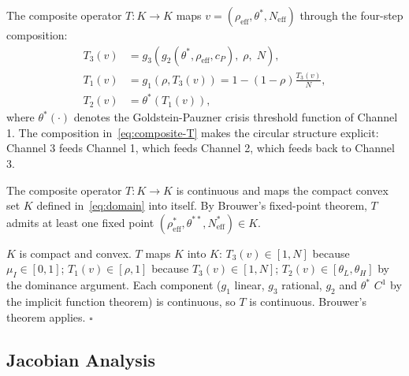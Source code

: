 The composite operator $T: K \to K$ maps $v = (\rho_{\text{eff}}, \theta^*, N_{\text{eff}})$ through the four-step composition:
\begin{equation}\label{eq:composite-T}
\begin{aligned}
  T_3(v) &= g_3\!\left(g_2(\theta^*, \rho_{\text{eff}}, c_P),\; \rho,\; N\right), \\
  T_1(v) &= g_1(\rho, T_3(v)) = 1 - (1-\rho)\frac{T_3(v)}{N}, \\
  T_2(v) &= \theta^*(T_1(v)),
\end{aligned}
\end{equation}
where $\theta^*(\cdot)$ denotes the Goldstein-Pauzner crisis threshold function of Channel 1. The composition in~\eqref{eq:composite-T} makes the circular structure explicit: Channel 3 feeds Channel 1, which feeds Channel 2, which feeds back to Channel 3.

\begin{proposition}\label{prop:fixed-point-existence}
  The composite operator $T: K \to K$ is continuous and maps the compact convex set $K$ defined in~\eqref{eq:domain} into itself. By Brouwer's fixed-point theorem, $T$ admits at least one fixed point $(\rho_{\text{eff}}^*, \theta^{**}, N_{\text{eff}}^*) \in K$.

   $K$ is compact and convex. $T$ maps $K$ into $K$: $T_3(v) \in [1, N]$ because $\mu_I \in [0,1]$; $T_1(v) \in [\rho, 1]$ because $T_3(v) \in [1, N]$; $T_2(v) \in [\theta_L, \theta_H]$ by the dominance argument. Each component ($g_1$ linear, $g_3$ rational, $g_2$ and $\theta^*$ $C^1$ by the implicit function theorem) is continuous, so $T$ is continuous. Brouwer's theorem applies. $\square$
\end{proposition}

\subsection{Jacobian Analysis}

